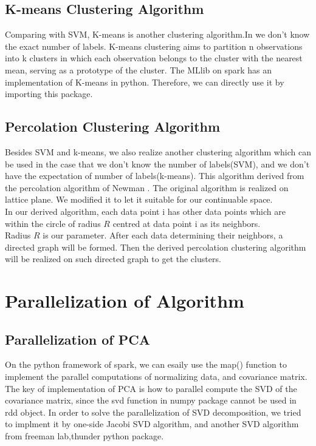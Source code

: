 \documentclass[a4paper]{article}
\begin{document}
\subsection{K-means Clustering Algorithm}

Comparing with SVM, K-means is another clustering algorithm.In  we don't know the exact number of labels.  K-means clustering aims to partition n observations into k clusters in which each observation belongs to the cluster with the nearest mean, serving as a prototype of the cluster.
The MLlib on spark has an implementation of K-means in python. Therefore, we can directly use it by importing this package. 


\subsection{Percolation Clustering Algorithm}

Besides SVM and k-means, we also realize another clustering algorithm which can be used in the case that we don't know the number of labels(SVM), and we don't have the expectation of number of labels(k-means). This algorithm derived from the percolation algorithm of Newman \cite{Percolation}.  The original algorithm is realized on lattice plane. We modified it to let it suitable for our continuable space. \\
In our derived algorithm, each data point i has other data points which are within the circle of radius  $R$ centred at data point i as its neighbors.\\
Radius $R$ is our parameter. After each data determining their neighbors, a directed graph will be formed. Then the derived percolation clustering algorithm will be realized on such directed graph to get the clusters. 

\section{Parallelization of Algorithm}

\subsection{Parallelization of PCA}

On the python framework of spark, we can esaily use the map() function to implement the parallel computations of normalizing data, and covariance matrix. The key of implementation of PCA is how to parallel compute the SVD of the covariance matrix, since the svd function in numpy package cannot be used in rdd object. In order to solve the parallelization of SVD decomposition, we tried to implment it by one-side Jacobi SVD algorithm, and another SVD algorithm from freeman lab,thunder python package.\\
\end{document}
